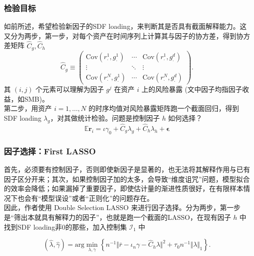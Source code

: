 \documentclass[
  UTF8,
  xcolor={dvipsnames,rgb},
  hyperref={colorlinks, citecolor=orange, linkcolor=black},
  aspectratio=169
  ]{beamer}
\begin{document}
\begin{frame}
    \frametitle{检验目标}
    如前所述，希望检验新因子的SDF loading，来判断其是否具有截面解释能力。这又分为两步，第一步，对每个资产在时间序列上计算其与因子的协方差，得到协方差矩阵 \(\hat{C}_g, \hat{C}_h\)
    \[
        \hat{C}_{g} \equiv  \begin{pmatrix}
        \mathrm{Cov}(r_{\cdot}^{1},g_{\cdot}^{1}) & \cdots & \mathrm{Cov}(r_{\cdot}^{1},g_{\cdot}^{d}) \\
        \vdots & \ddots & \vdots \\
        \mathrm{Cov}(r_{\cdot}^{N},g_{\cdot}^{1}) & \cdots & \mathrm{Cov}(r_{\cdot}^{N},g_{\cdot}^{d})
        \end{pmatrix}
    .\]
    其 \((i,j)\) 个元素可以理解为因子 \(g^{j}\) 在资产 \(i\) 上的风险暴露 (文中因子均指因子收益，如SMB)。
    \\
    \vspace{1em}
    第二步，用资产 \(i=1, \ldots ,N\) 的时序均值对风险暴露矩阵跑一个截面回归，得到SDF loading \(\lambda_g\)，对其做统计检验。问题是控制因子 \(h\) 如何选择？
    \[\mathbb{E} \boldsymbol{r}_{i} =\iota \gamma_{0}+\hat{C}_{g}\lambda_{g}+\hat{C}_{h}\lambda_{h}+\boldsymbol{\epsilon}\]
\end{frame}

\begin{frame}
    \frametitle{因子选择：First LASSO}
    首先，必须要有控制因子，否则即使新因子是显著的，也无法将其解释作用与已有因子区分开来；其次，如果控制因子加的太多，会导致``维度诅咒''问题，模型拟合的效率会降低；如果漏掉了重要因子，即使估计量的渐进性质很好，在有限样本情况下也会有``模型误设''或者``正则化''的问题存在。
    \\
    \vspace{1em}
    因此，作者使用 Double Selection LASSO 来进行因子选择。分为两步，第一步是``筛出本就具有解释力的因子''，也就是跑一个截面的LASSO，在现有因子 \(h\) 中找到SDF loading非0的那些，加入控制集 \(\mathcal{I}_1\) 中

    \[( \hat{\lambda},\hat{\gamma} ) = \textrm{arg} \min_{\lambda,\gamma} \left\{ n^{-1} \Vert \bar{r}-\iota_{n}\gamma-\hat{C}_{h}\lambda \Vert^{2} + \tau_{0}n^{-1} \Vert \lambda \Vert_{1} \right\} .\]

\end{frame}
\end{document}
